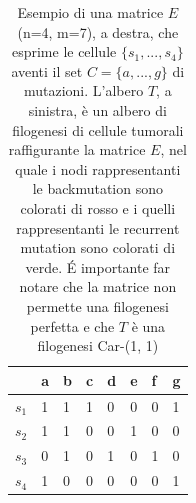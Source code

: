 \documentclass[12pt]{report}
\begin{document}
\begin{table}[H]
    \begin{minipage}{0.5\textwidth}
    \centering
      \begin{tabular}{|l|l|l|l|l|l|l|l|}
        \hline
         & a & b & c & d & e & f & g\\
        \hline
        $s_{1}$ & 1 & 1 & 1 & 0 & 0 & 0 & 1\\
        \hline
        $s_{2}$ & 1 & 1 & 0 & 0 & 1 & 0 & 0\\
        \hline
        $s_{3}$ & 0 & 1 & 0 & 1 & 0 & 1 & 0\\
        \hline
        $s_{4}$ & 1 & 0 & 0 & 0 & 0 & 0 & 1\\
        \hline
      \end{tabular}
    \end{minipage}
    \caption{Esempio di una matrice $E$ (n=4, m=7), a destra, che esprime le cellule $\{ s_{1},...,s_{4}\}$ aventi il set $C = \{ a,...,g\}$ di mutazioni. L'albero $T$, a sinistra, è un albero di filogenesi di cellule tumorali raffigurante la matrice $E$,
    nel quale i nodi rappresentanti le backmutation sono colorati di rosso e i quelli rappresentanti le recurrent mutation sono colorati di verde. \'E importante far notare che la matrice non permette una filogenesi perfetta e che $T$ è una filogenesi Car-(1, 1)}
    \label{fig:fig1}
  \end{table}
\end{document}

